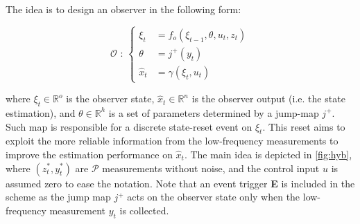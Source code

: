 \medskip
The idea is to design an observer in the following form: 

\begin{equation}
    \label{eqn:observer_hyb}
    \mathcal{O} \text{ : }
    \begin{cases}
        \xi_t &= f_o(\xi_{t-1},\theta,u_t,z_t) \\
        \theta &= j^{+}(y_t) \\
        \hat{x}_t &= \gamma(\xi_t,u_t) 
    \end{cases}
\end{equation}

where $\xi_t\in\mathbb{R}^o$ is the observer state, $\hat{x}_t\in\mathbb{R}^n$ is the observer output (i.e. the state estimation), and $\theta\in\mathbb{R}^h$ is a set of parameters determined by a jump-map $j^{+}$. Such map is responsible for a discrete state-reset event on $\xi_t$. This reset aims to exploit the more reliable information from the low-frequency measurements to improve the estimation performance on $\hat{x}_t$. The main idea is depicted in \cref{fig:hyb}, where $(z_t^*,y_t^*)$ are $\mathcal{P}$ measurements without noise, and the control input $u$ is assumed zero to ease the notation. Note that an event trigger \textbf{E} is included in the scheme as the jump map $j^+$ acts on the observer state only when the low-frequency measurement $y_t$ is collected.

